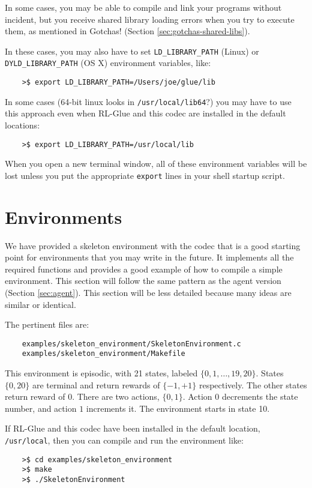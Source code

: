 \documentclass[11pt]{article}
\begin{document}
In some cases, you may be able to compile and link your programs without incident, but you receive shared library loading errors when you try to execute them, as mentioned in Gotchas! (Section \ref{sec:gotchas-shared-libs}).

In these cases, you may also have to set \texttt{LD\_LIBRARY\_PATH} (Linux) or \texttt{DYLD\_LIBRARY\_PATH} (OS X) environment variables, like:
\begin{verbatim}
	>$ export LD_LIBRARY_PATH=/Users/joe/glue/lib
\end{verbatim}

In some cases (64-bit linux looks in \texttt{/usr/local/lib64}?) you may have to use this approach even when RL-Glue and this codec are installed in the default locations:
\begin{verbatim}
	>$ export LD_LIBRARY_PATH=/usr/local/lib
\end{verbatim}

When you open a new terminal window, all of these environment variables will be lost unless you put the appropriate \texttt{export} lines in your shell startup script.

\section{Environments}
We have provided a skeleton environment with the codec that is a good starting point for environments that you may write in the future.
It implements all the required functions and provides a good example of how to compile a simple environment.  This section will follow the same 
pattern as the agent version (Section \ref{sec:agent}).  This section will be less detailed because many ideas are similar or identical.

The pertinent files are:
\begin{verbatim}
	examples/skeleton_environment/SkeletonEnvironment.c
	examples/skeleton_environment/Makefile
\end{verbatim}

This environment is episodic, with 21 states, labeled $\{0, 1,\ldots,19,20\}$. States $\{0, 20\}$ are terminal and return rewards of $\{-1, +1\}$ respectively.  The other states return reward of $0$.
There are two actions, $\{0, 1\}$.  Action $0$ decrements the state number, and action $1$ increments it. The environment starts in state 10.

If RL-Glue and this codec have been installed in the default location, \texttt{/usr/local}, then you can compile and run the environment like:
\begin{verbatim}
	>$ cd examples/skeleton_environment
	>$ make
	>$ ./SkeletonEnvironment
\end{verbatim}
\end{document}
